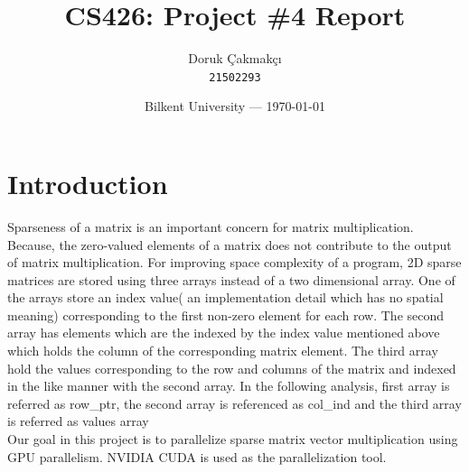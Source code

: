 \documentclass{article}
\title{CS426: Project \#4 Report} %
\author{Doruk Çakmakçı\\ \texttt{21502293}} %
\date{Bilkent University --- \today} %
\begin{document}
\maketitle %


\section{Introduction} 
\qquad Sparseness of a matrix is an important concern for matrix multiplication. Because, the zero-valued elements of a matrix does not contribute to the output of matrix multiplication. For improving space complexity of a program, 2D sparse matrices are stored using three arrays instead of a two dimensional array. One of the arrays store an index value( an implementation detail which has no spatial meaning) corresponding to the first non-zero element for each row. The second array has elements which are the indexed by the index value mentioned above which holds the column of the corresponding matrix element. The third array hold the values corresponding to the row and columns of the matrix and indexed in the like manner with the second array. In the following analysis, first array is referred as row\_ptr, the second array is referenced as col\_ind and the third array is referred as values array\\
\null \qquad Our goal in this project is to parallelize sparse matrix vector multiplication using GPU parallelism. NVIDIA CUDA is used as the parallelization tool.
\end{document}
